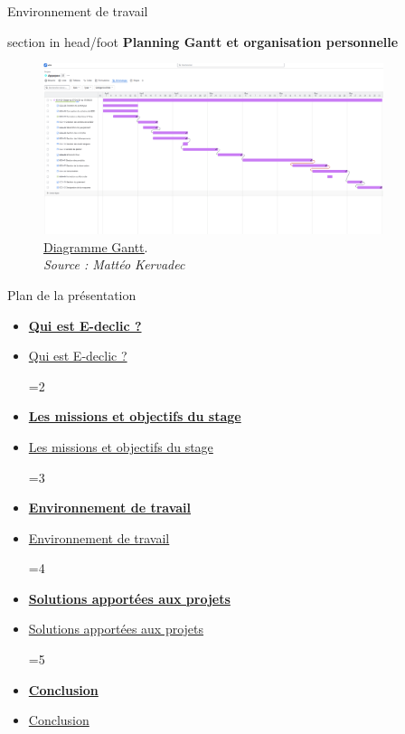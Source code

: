 \documentclass{beamer}
\newcommand{\planLine}[4]{
  \ifnum#1=#2
    \item \hyperlink{#3}{\textbf{\large #4}}
  \else
    \item \hyperlink{#3}{#4}
  \fi
}
\newcommand{\planSlide}[1]{
  	\begin{frame}{Plan de la présentation}
  		\begin{center}
  			\begin{minipage}{1\textwidth}
				\begin{itemize}
      			\planLine{#1}{1}{organisation}{Qui est E-declic ?}
      			\planLine{#1}{2}{sujet}{Les missions et objectifs du stage}
      			\planLine{#1}{3}{environnement}{Environnement de travail}
      			\planLine{#1}{4}{realisation}{Solutions apportées aux projets}
      			\planLine{#1}{5}{conclusion}{Conclusion}
	    		\end{itemize}
  		\end{minipage}
	\end{center}
	\vfill
	\end{frame}
}
\begin{document}
\begin{frame}[label=env]{Environnement de travail}  
	\begin{beamercolorbox}[wd=\paperwidth,ht=1.5em,dp=0.5em,leftskip=0.5cm]{section in head/foot}
  		\large \textbf{Planning Gantt et organisation personnelle}
	\end{beamercolorbox}
	\vspace{0.5em}
	\begin{center}
		\begin{minipage}{0.9\textwidth}
			\begin{figure}[t]
  				\centering
  				\includegraphics[height=5cm]{../img/gantt.png}
  				\caption{
    					\href{https://etudiant-team-z8ihahyp.atlassian.net/jira/software/projects/ECS/boards/1/timeline?timeline=WEEKS}{\underline{Diagramme Gantt}}.\\
    					\textit{Source : Mattéo Kervadec}
  				}
  				\label{fig:gantt}
			\end{figure}
		\end{minipage}
	\end{center}
	\vfill
\end{frame}

\planSlide{4}
\end{document}
